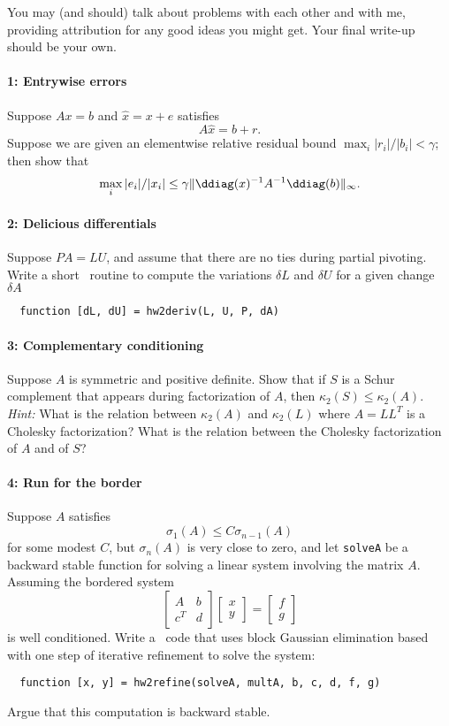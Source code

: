 \documentclass[12pt, leqno]{article} %
\begin{document}

You may (and should) talk about problems with each other and with me,
providing attribution for any good ideas you might get.  Your final
write-up should be your own.

\paragraph*{1: Entrywise errors}
Suppose $Ax = b$ and $\hat{x} = x + e$ satisfies
\[
  A \hat{x} = b + r.
\]
Suppose we are given an elementwise relative residual bound
$\max_i |r_i|/|b_i| < \gamma$; then show that
\[
  \max_i |e_i|/|x_i| \leq
  \gamma \|\ddiag(x)^{-1} A^{-1} \ddiag(b)\|_\infty.
\]

\paragraph*{2: Delicious differentials}
Suppose $PA = LU$, and assume that there are no ties during partial
pivoting.  Write a short \matlab\ routine to compute the variations
$\delta L$ and $\delta U$ for a given change $\delta A$
\begin{lstlisting}
  function [dL, dU] = hw2deriv(L, U, P, dA)
\end{lstlisting}

\paragraph*{3: Complementary conditioning}
Suppose $A$ is symmetric and positive definite.  Show that if $S$
is a Schur complement that appears during factorization of $A$,
then $\kappa_2(S) \leq \kappa_2(A)$.  {\em Hint:} What is the
relation between $\kappa_2(A)$ and $\kappa_2(L)$ where $A = LL^T$
is a Cholesky factorization?  What is the relation between the
Cholesky factorization of $A$ and of $S$?

\paragraph*{4: Run for the border}
Suppose $A$ satisfies
\[
  \sigma_1(A) \leq C \sigma_{n-1}(A)
\]
for some modest $C$, but $\sigma_n(A)$ is very close to zero,
and let {\tt solveA} be a backward stable function for solving
a linear system involving the matrix $A$.  Assuming the bordered
system
\[
  \begin{bmatrix} A & b \\ c^T & d \end{bmatrix}
  \begin{bmatrix} x \\ y \end{bmatrix} =
  \begin{bmatrix} f \\ g \end{bmatrix}
\]
is well conditioned.  Write a \matlab\ code that uses
block Gaussian elimination based with one
step of iterative refinement to solve the system:
\begin{lstlisting}
  function [x, y] = hw2refine(solveA, multA, b, c, d, f, g)
\end{lstlisting}
Argue that this computation is backward stable.
\end{document}
